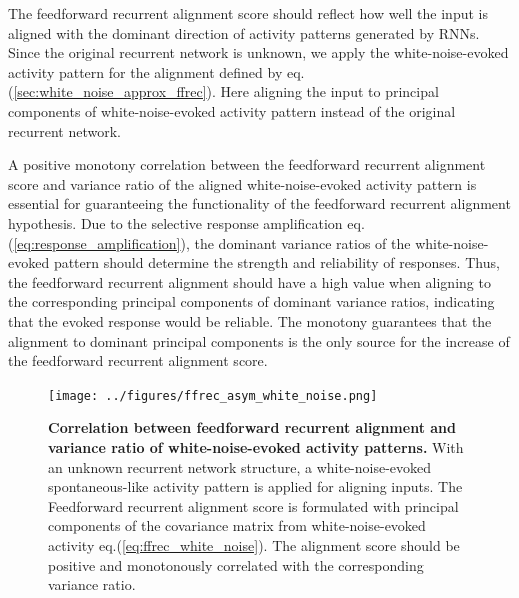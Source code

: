 \documentclass[11pt]{article}
\begin{document}
	The feedforward recurrent alignment score should reflect how well the input is aligned with the dominant direction of activity patterns generated by RNNs. Since the original recurrent network is unknown, we apply the white-noise-evoked activity pattern  for the alignment defined by eq.(\ref{sec:white_noise_approx_ffrec}). Here aligning the input to principal components of white-noise-evoked activity pattern instead of the original recurrent network. 
	
	A positive monotony correlation between the feedforward recurrent alignment score and variance ratio of the aligned white-noise-evoked activity pattern is essential for guaranteeing the functionality of the feedforward recurrent alignment hypothesis. %
	Due to the selective response amplification eq.(\ref{eq:response_amplification}), the dominant variance ratios of the white-noise-evoked pattern should determine the strength and reliability of responses. Thus, the feedforward recurrent alignment should have a high value when aligning to the corresponding principal components of dominant variance ratios, indicating that the evoked response would be reliable. The monotony guarantees that the alignment to dominant principal components is the only source for the increase of the feedforward recurrent alignment score. 
	

		\begin{figure} 
			\centering
			\caption{\textbf{Correlation between feedforward recurrent alignment and variance ratio of white-noise-evoked activity patterns.} With an unknown recurrent network structure, a white-noise-evoked spontaneous-like activity pattern is applied for aligning inputs. The Feedforward recurrent alignment score is formulated with principal components of the covariance matrix from white-noise-evoked activity eq.(\ref{eq:ffrec_white_noise}). The alignment score should be positive and monotonously correlated with the corresponding variance ratio.}
			\texttt{[image: ../figures/ffrec\_asym\_white\_noise.png]}
			\label{fig:ffrec_variance_ratio_white_noise}
		\end{figure}
\end{document}
